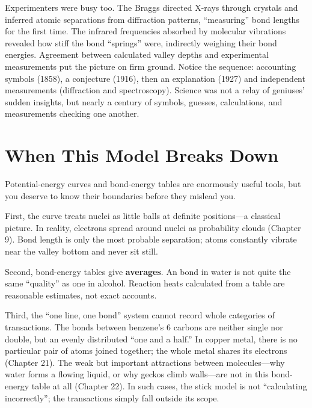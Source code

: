 \begin{zhengju}
Experimenters were busy too. The Braggs directed X-rays through crystals and inferred atomic separations from diffraction patterns, ``measuring'' bond lengths for the first time. The infrared frequencies absorbed by molecular vibrations revealed how stiff the bond ``springs'' were, indirectly weighing their bond energies. Agreement between calculated valley depths and experimental measurements put the picture on firm ground. Notice the sequence: accounting symbols (1858), a conjecture (1916), then an explanation (1927) and independent measurements (diffraction and spectroscopy). Science was not a relay of geniuses' sudden insights, but nearly a century of symbols, guesses, calculations, and measurements checking one another.
\end{zhengju}

\section{When This Model Breaks Down}

Potential-energy curves and bond-energy tables are enormously useful tools, but you deserve to know their boundaries before they mislead you.

First, the curve treats nuclei as little balls at definite positions---a classical picture. In reality, electrons spread around nuclei as probability clouds (Chapter 9). Bond length is only the most probable separation; atoms constantly vibrate near the valley bottom and never sit still.

Second, bond-energy tables give \textbf{averages}. An  bond in water is not quite the same ``quality'' as one in alcohol. Reaction heats calculated from a table are reasonable estimates, not exact accounts.

Third, the ``one line, one bond'' system cannot record whole categories of transactions. The bonds between benzene's 6 carbons are neither single nor double, but an evenly distributed ``one and a half.'' In copper metal, there is no particular pair of atoms joined together; the whole metal shares its electrons (Chapter 21). The weak but important attractions between molecules---why water forms a flowing liquid, or why geckos climb walls---are not in this bond-energy table at all (Chapter 22). In such cases, the stick model is not ``calculating incorrectly''; the transactions simply fall outside its scope.

